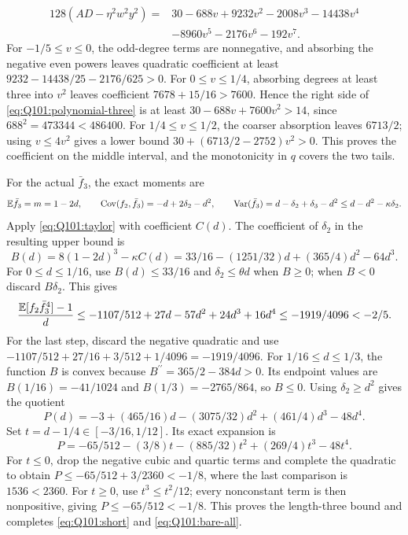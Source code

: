 \begin{equation}\tag{Q101.4.2}\label{eq:Q101:polynomial-three}
 \begin{split}
 128(AD-\eta^2w^2y^2)
 ={}&30-688v+9232v^2-2008v^3-14438v^4\\
 &-8960v^5-2176v^6-192v^7.
 \end{split}
\end{equation}
For $-1/5\le\allowbreak  v\le\allowbreak 0$, the odd-degree terms are nonnegative, and
absorbing the negative even powers leaves quadratic coefficient at least
$9232-14438/25-2176/625>\allowbreak 0$.
For $0\le\allowbreak  v\le\allowbreak 1/4$, absorbing degrees at least three into $v^2$
leaves coefficient $7678+15/16>\allowbreak 7600$. Hence the right side of
\eqref{eq:Q101:polynomial-three} is at least
$30-688v+7600v^2>\allowbreak 14$, since $688^2=\allowbreak 473344<\allowbreak 486400$.
For $1/4\le\allowbreak  v\le\allowbreak 1/2$, the coarser absorption leaves $6713/2$;
using $v\le\allowbreak 4v^2$ gives a lower bound
$30+(6713/2-2752)v^2>\allowbreak 0$.
This proves the coefficient on the middle interval, and the
monotonicity in $q$ covers the two tails.

For the actual $\bar f_3$, the exact moments are
\[
 \mathbb E\bar f_3=m=1-2d,\qquad
 \operatorname{Cov}(f_2,\bar f_3)=-d+2\delta_2-d^2,\qquad
 \operatorname{Var}(\bar f_3)=d-\delta_2+\delta_3-d^2
 \le d-d^2-\kappa\delta_2.
\]
Apply \eqref{eq:Q101:taylor} with coefficient $C(d)$.
The coefficient of $\delta_2$ in the resulting upper bound is
\[
 B(d)=8(1-2d)^3-\kappa C(d)
 =33/16-(1251/32)d+(365/4)d^2-64d^3.
\]
For $0\le\allowbreak  d\le\allowbreak 1/16$, use $B(d)\le\allowbreak 33/16$ and
$\delta_2\le\allowbreak \theta d$ when $B\ge\allowbreak 0$; when $B<\allowbreak 0$ discard
$B\delta_2$. This gives
\[
 \frac{\mathbb E[f_2\bar f_3^4]-1}d
 \le-1107/512+27d-57d^2+24d^3+16d^4
 \le-1919/4096<-2/5.
\]
For the last step, discard the negative quadratic and use
$-1107/512+27/16+3/512+1/4096=\allowbreak -1919/4096$.
For $1/16\le\allowbreak  d\le\allowbreak 1/3$, the function $B$ is convex because
$B^{\prime\prime}=\allowbreak 365/2-384d>\allowbreak 0$.
Its endpoint values are $B(1/16)=\allowbreak -41/1024$ and
$B(1/3)=\allowbreak -2765/864$, so $B\le\allowbreak 0$.
Using $\delta_2\ge\allowbreak  d^2$ gives the quotient
\[
 P(d)=-3+(465/16)d-(3075/32)d^2+(461/4)d^3-48d^4.
\]
Set $t=\allowbreak d-1/4\in[-3/16,\allowbreak 1/12]$. Its exact expansion is
\[
 P=-65/512-(3/8)t-(885/32)t^2+(269/4)t^3-48t^4.
\]
For $t\le\allowbreak 0$, drop the negative cubic and quartic terms and complete
the quadratic to obtain $P\le\allowbreak -65/512+3/2360<\allowbreak -1/8$,
where the last comparison is $1536<\allowbreak 2360$.
For $t\ge\allowbreak 0$, use $t^3\le\allowbreak  t^2/12$; every nonconstant term is then
nonpositive, giving $P\le\allowbreak -65/512<\allowbreak -1/8$.
This proves the length-three bound and completes
\eqref{eq:Q101:short} and \eqref{eq:Q101:bare-all}.
